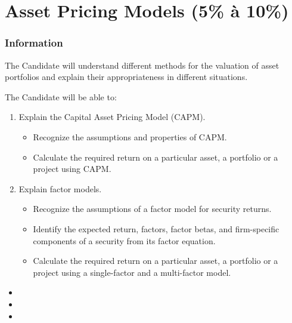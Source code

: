 \chapter[Asset Pricing Models]{Asset Pricing Models (5\% à 10\%)}

\subsection{Information}

\begin{distributions}[Objective]
The Candidate will understand different methods for the valuation of asset portfolios and explain their appropriateness in different situations.
\end{distributions}

\begin{outcomes}
The Candidate will be able to:
\begin{enumerate}[label = \alph*)]
	\item	Explain the Capital Asset Pricing Model (CAPM).
		\begin{knowledge}[]
		\begin{itemize}
		\item	Recognize the assumptions and properties of CAPM.
		\item	Calculate the required return on a particular asset, a portfolio or a project using CAPM.
		\end{itemize}
		\end{knowledge}
	\item	Explain factor models.
		\begin{knowledge}[]
		\begin{itemize}
		\item	Recognize the assumptions of a factor model for security returns.
		\item	Identify the expected return, factors, factor betas, and firm-specific components of a security from its factor equation.
		\item	Calculate the required return on a particular asset, a portfolio or a project using a single-factor and a multi-factor model.
		\end{itemize}
		\end{knowledge}
\end{enumerate}
\end{outcomes}


\begin{ASM_chapter}
\begin{itemize}
	\item	{}
	\item	{}
	\item	{}
\end{itemize}
\end{ASM_chapter}

